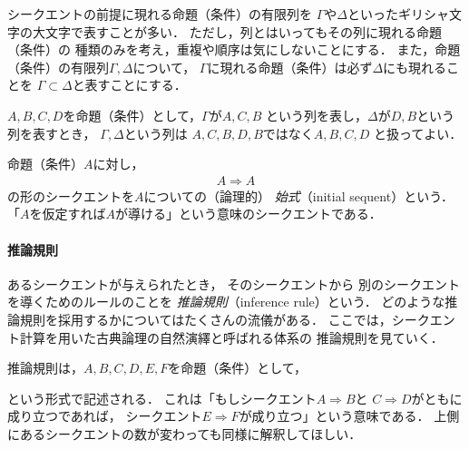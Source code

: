  シークエントの前提に現れる命題（条件）の有限列を
 $\varGamma$や$\varDelta$といったギリシャ文字の大文字で表すことが多い．
 ただし，列とはいってもその列に現れる命題（条件）の
 種類のみを考え，重複や順序は気にしないことにする．
 また，命題（条件）の有限列$\varGamma,  \varDelta$について，
 $\varGamma$に現れる命題（条件）は必ず$\varDelta$にも現れることを
 $\varGamma \subset \varDelta$と表すことにする．

 \begin{ex}
   $A,  B,  C,  D$を命題（条件）として，$\varGamma$が$A,  C,  B$
   という列を表し，$\varDelta$が$D,  B$という列を表すとき，
   $\varGamma,  \varDelta$という列は
   $A,  C,  B,  D,  B$ではなく$A,  B,  C,   D$
   と扱ってよい．
 \end{ex}

 命題（条件）$A$に対し，
 \begin{align}
   A \Longrightarrow A 
   \label{eq:sisiki}
 \end{align}
 の形のシークエントを$A$についての（論理的）
 \emph{始式}（initial sequent）という．
 「$A$を仮定すれば$A$が導ける」という意味のシークエントである．

 \paragraph{推論規則}
 あるシークエントが与えられたとき，
 そのシークエントから
 別のシークエントを導くためのルールのことを
 \emph{推論規則}（inference rule）という．
 どのような推論規則を採用するかについてはたくさんの流儀がある．
 ここでは，シークエント計算を用いた古典論理の自然演繹と呼ばれる体系の
 推論規則を見ていく．
 
 推論規則は，$A,  B,  C,  D,  E,  F$を命題（条件）として，
  \begin{prooftree}
  \end{prooftree}
 という形式で記述される．
 これは「もしシークエント$A \Longrightarrow B$と
 $C \Longrightarrow D$がともに成り立つであれば，
 シークエント$E \Longrightarrow F$が成り立つ」という意味である．
 上側にあるシークエントの数が変わっても同様に解釈してほしい． 

